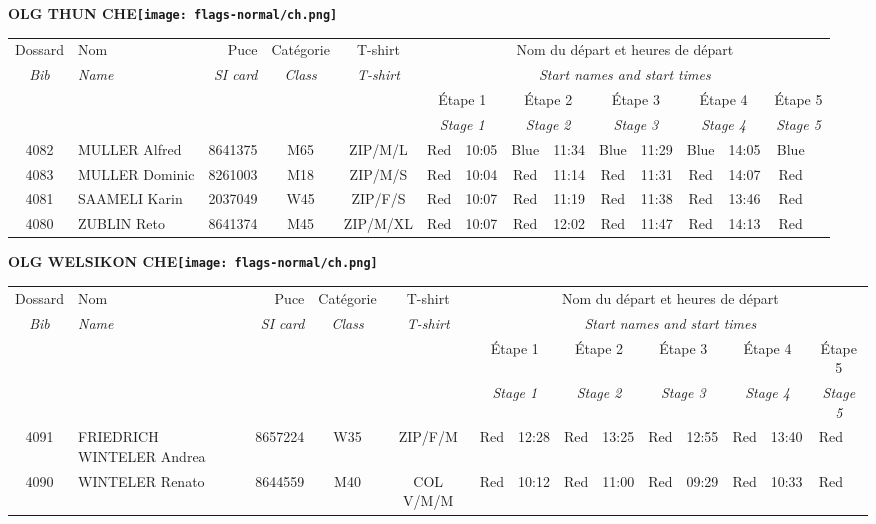 \documentclass{report}
\begin{document}
\newpage
  \Huge \centering \bfseries OLG THUN  CHE\normalfont \footnotesize \sffamily \hfill \texttt{[image: flags-normal/ch.png]} \newline 
  \begin{longtable}{|c|l|r|c|c|*{5}{cc|}}
    Dossard & Nom  & Puce    & Catégorie & T-shirt & \multicolumn{10}{c|}{Nom du départ et heures de départ} \\
    \itshape Bib     & \itshape Name & \itshape SI card & \itshape Class  & \itshape  T-shirt  & \multicolumn{10}{c|}{\itshape Start names and start times} \\
    \hline
    & & & & & \multicolumn{2}{c|}{Étape 1} & \multicolumn{2}{c|}{Étape 2} & \multicolumn{2}{c|}{Étape 3} & \multicolumn{2}{c|}{Étape 4} & \multicolumn{2}{c|}{Étape 5} \\
    & & & & & \multicolumn{2}{c|}{\itshape Stage 1} & \multicolumn{2}{c|}{\itshape Stage 2} & \multicolumn{2}{c|}{\itshape Stage 3} & \multicolumn{2}{c|}{\itshape Stage 4} & \multicolumn{2}{c|}{\itshape Stage 5} \\
    \hline
    4082 & MULLER Alfred & 8641375 & M65 & ZIP/M/L & Red & 10:05 & Blue & 11:34 & Blue & 11:29 & Blue & 14:05 & Blue &  \\
    4083 & MULLER Dominic & 8261003 & M18 & ZIP/M/S & Red & 10:04 & Red & 11:14 & Red & 11:31 & Red & 14:07 & Red &  \\
    4081 & SAAMELI Karin & 2037049 & W45 & ZIP/F/S & Red & 10:07 & Red & 11:19 & Red & 11:38 & Red & 13:46 & Red &  \\
    4080 & ZUBLIN Reto & 8641374 & M45 & ZIP/M/XL & Red & 10:07 & Red & 12:02 & Red & 11:47 & Red & 14:13 & Red &  \\
  \end{longtable}
\newpage
  \Huge \centering \bfseries OLG WELSIKON  CHE\normalfont \footnotesize \sffamily \hfill \texttt{[image: flags-normal/ch.png]} \newline 
  \begin{longtable}{|c|l|r|c|c|*{5}{cc|}}
    Dossard & Nom  & Puce    & Catégorie & T-shirt & \multicolumn{10}{c|}{Nom du départ et heures de départ} \\
    \itshape Bib     & \itshape Name & \itshape SI card & \itshape Class  & \itshape  T-shirt  & \multicolumn{10}{c|}{\itshape Start names and start times} \\
    \hline
    & & & & & \multicolumn{2}{c|}{Étape 1} & \multicolumn{2}{c|}{Étape 2} & \multicolumn{2}{c|}{Étape 3} & \multicolumn{2}{c|}{Étape 4} & \multicolumn{2}{c|}{Étape 5} \\
    & & & & & \multicolumn{2}{c|}{\itshape Stage 1} & \multicolumn{2}{c|}{\itshape Stage 2} & \multicolumn{2}{c|}{\itshape Stage 3} & \multicolumn{2}{c|}{\itshape Stage 4} & \multicolumn{2}{c|}{\itshape Stage 5} \\
    \hline
    4091 & FRIEDRICH WINTELER Andrea & 8657224 & W35 & ZIP/F/M & Red & 12:28 & Red & 13:25 & Red & 12:55 & Red & 13:40 & Red &  \\
    4090 & WINTELER Renato & 8644559 & M40 & COL V/M/M & Red & 10:12 & Red & 11:00 & Red & 09:29 & Red & 10:33 & Red &  \\
  \end{longtable}
\end{document}
